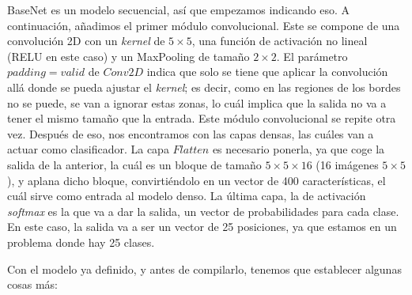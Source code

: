 \documentclass[11pt,a4paper]{article}
\begin{document}
BaseNet es un modelo secuencial, así que empezamos indicando eso. A continuación, añadimos el primer módulo convolucional.
Este se compone de una convolución 2D con un \textit{kernel} de $5 \times 5$, una función de activación no lineal (RELU en
este caso) y un MaxPooling de tamaño $2 \times 2$. El parámetro $padding = valid$ de $Conv2D$ indica que solo se tiene que
aplicar la convolución allá donde se pueda ajustar el \textit{kernel}; es decir, como en las regiones de los bordes no se
puede, se van a ignorar estas zonas, lo cuál implica que la salida no va a tener el mismo tamaño que la entrada. Este módulo
convolucional se repite otra vez. Después de eso, nos encontramos con las capas densas, las cuáles van a actuar como
clasificador. La capa $Flatten$ es necesario ponerla, ya que coge la salida de la anterior, la cuál es un bloque de tamaño
$5 \times 5 \times 16$ (16 imágenes $5 \times 5$), y aplana dicho bloque, convirtiéndolo en un vector de 400 características,
el cuál sirve como entrada al modelo denso. La última capa, la de activación \textit{softmax} es la que va a dar la salida,
un vector de probabilidades para cada clase. En este caso, la salida va a ser un vector de 25 posiciones, ya que estamos
en un problema donde hay 25 clases.

Con el modelo ya definido, y antes de compilarlo, tenemos que establecer algunas cosas más:
\end{document}
